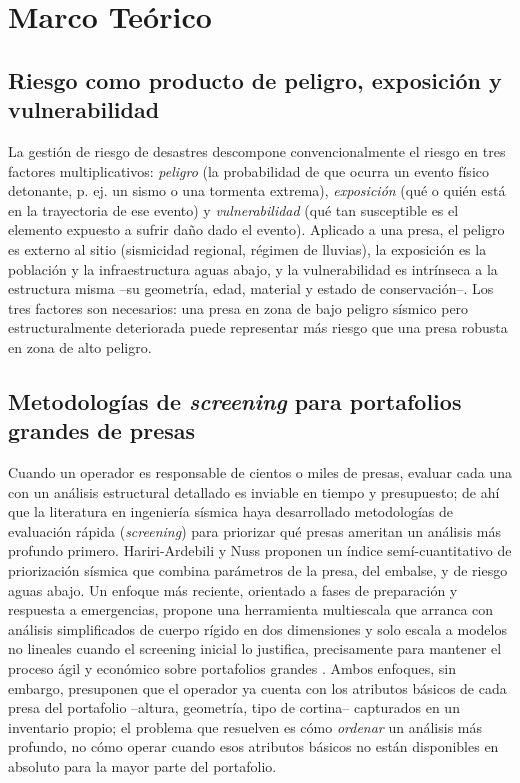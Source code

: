 \section{Marco Te\'orico}
\label{sec:marco_teorico}

\subsection{Riesgo como producto de peligro, exposici\'on y vulnerabilidad}

La gesti\'on de riesgo de desastres descompone convencionalmente el riesgo en tres factores multiplicativos: \emph{peligro} (la probabilidad de que ocurra un evento f\'isico detonante, p. ej. un sismo o una tormenta extrema), \emph{exposici\'on} (qu\'e o qui\'en est\'a en la trayectoria de ese evento) y \emph{vulnerabilidad} (qu\'e tan susceptible es el elemento expuesto a sufrir da\~no dado el evento). Aplicado a una presa, el peligro es externo al sitio (sismicidad regional, r\'egimen de lluvias), la exposici\'on es la poblaci\'on y la infraestructura aguas abajo, y la vulnerabilidad es intr\'inseca a la estructura misma --su geometr\'ia, edad, material y estado de conservaci\'on--. Los tres factores son necesarios: una presa en zona de bajo peligro s\'ismico pero estructuralmente deteriorada puede representar m\'as riesgo que una presa robusta en zona de alto peligro.

\subsection{Metodolog\'ias de \emph{screening} para portafolios grandes de presas}

Cuando un operador es responsable de cientos o miles de presas, evaluar cada una con un an\'alisis estructural detallado es inviable en tiempo y presupuesto; de ah\'i que la literatura en ingenier\'ia s\'ismica haya desarrollado metodolog\'ias de evaluaci\'on r\'apida (\emph{screening}) para priorizar qu\'e presas ameritan un an\'alisis m\'as profundo primero. Hariri-Ardebili y Nuss \cite{hariri2018prioritization} proponen un \'indice sem\'i-cuantitativo de priorizaci\'on s\'ismica que combina par\'ametros de la presa, del embalse, y de riesgo aguas abajo. Un enfoque m\'as reciente, orientado a fases de preparaci\'on y respuesta a emergencias, propone una herramienta multiescala que arranca con an\'alisis simplificados de cuerpo r\'igido en dos dimensiones y solo escala a modelos no lineales cuando el screening inicial lo justifica, precisamente para mantener el proceso \'agil y econ\'omico sobre portafolios grandes \cite{natural2023multiscale}. Ambos enfoques, sin embargo, presuponen que el operador ya cuenta con los atributos b\'asicos de cada presa del portafolio --altura, geometr\'ia, tipo de cortina-- capturados en un inventario propio; el problema que resuelven es c\'omo \emph{ordenar} un an\'alisis m\'as profundo, no c\'omo operar cuando esos atributos b\'asicos no est\'an disponibles en absoluto para la mayor parte del portafolio.

